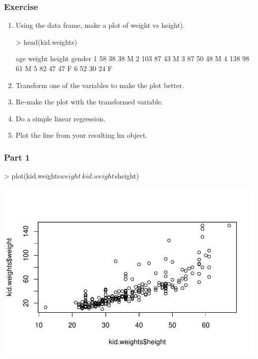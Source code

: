 \begin{frame}
  \frametitle{Exercise}
  \begin{enumerate}
  \item Using the  data frame, make a plot of weight vs height).
\begin{Schunk}
\begin{Sinput}
> head(kid.weights)
\end{Sinput}
\begin{Soutput}
  age weight height gender
1  58     38     38      M
2 103     87     43      M
3  87     50     48      M
4 138     98     61      M
5  82     47     47      F
6  52     30     24      F
\end{Soutput}
\end{Schunk}
  \item Transform one of the variables to make the plot better.
  \item Re-make the plot with the transformed variable.
  \item Do a simple linear regression.
  \item Plot the line from your resulting lm object.
  \end{enumerate}
\end{frame}

\begin{frame}
  \frametitle{Part 1}
\begin{Schunk}
\begin{Sinput}
> plot(kid.weights$weight ~ kid.weights$height)
\end{Sinput}
\end{Schunk}
\includegraphics{plots/fig-007}
\end{frame}

